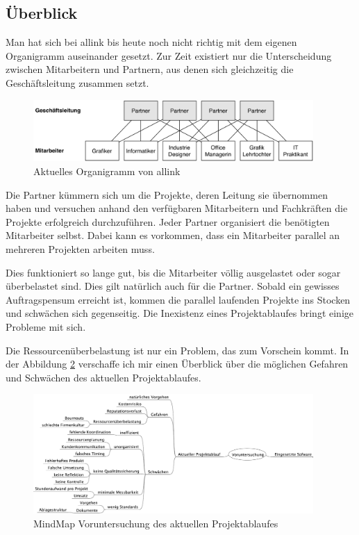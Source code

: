 \subsection{Überblick}
Man hat sich bei allink bis heute noch nicht richtig mit dem eigenen Organigramm
auseinander gesetzt. Zur Zeit existiert nur die Unterscheidung zwischen Mitarbeitern 
und Partnern, aus denen sich gleichzeitig die Geschäftsleitung zusammen setzt.

\begin{figure}[htbp]
\begin{center}
\includegraphics[width=0.95\textwidth,angle=0]{./bilder/ist_organigramm.pdf}
\caption{Aktuelles Organigramm von allink}
\label{pic:ist_organigramm}
\end{center}
\end{figure}

Die Partner kümmern sich um die Projekte, deren Leitung sie übernommen haben
und versuchen anhand den verfügbaren Mitarbeitern und Fachkräften die Projekte 
erfolgreich durchzuführen. Jeder Partner organisiert die benötigten Mitarbeiter
selbst. Dabei kann es vorkommen, dass ein Mitarbeiter parallel an
mehreren Projekten arbeiten muss.

Dies funktioniert so lange gut, bis die Mitarbeiter völlig ausgelastet oder sogar
überbelastet sind. Dies gilt natürlich auch für die Partner. Sobald ein gewisses 
Auftragspensum erreicht ist, kommen die parallel laufenden Projekte ins Stocken 
und schwächen sich gegenseitig. Die Inexistenz eines Projektablaufes bringt
einige Probleme mit sich.

Die Ressourcenüberbelastung ist nur ein Problem, das zum Vorschein kommt. In der
Abbildung \ref{pic:voruntersuchung_projektablauf} verschaffe ich mir einen 
Überblick über die möglichen Gefahren und Schwächen des aktuellen Projektablaufes.

\begin{figure}[htbp]
\begin{center}
\includegraphics[width=0.95\textwidth,angle=0]{./mindmaps/voruntersuchung_projektablauf.pdf}
\caption{MindMap Voruntersuchung des aktuellen Projektablaufes}
\label{pic:voruntersuchung_projektablauf}
\end{center}
\end{figure}

